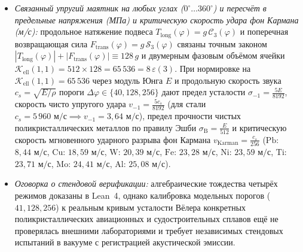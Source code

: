 \begin{enumerate}[label=\textbf{\arabic*.},leftmargin=*]
\begin{itemize}[noitemsep]
  \item \emph{Связанный упругий маятник на любых углах ($0^\circ\dots 360^\circ$) и пересчёт в предельные напряжения (МПа) и критическую скорость удара фон Кармана (м/с):} продольное натяжение подвеса $T_{\mathrm{long}}(\varphi) = g\,\mathcal{C}_3(\varphi)$ и поперечная возвращающая сила $F_{\mathrm{trans}}(\varphi) = g\,\mathcal{S}_3(\varphi)$ связаны точным законом $|T_{\mathrm{long}}(\varphi)| + |F_{\mathrm{trans}}(\varphi)| \equiv 128\,g$ и двумерным фазовым объёмом ячейки $\mathcal{K}_{\mathrm{ell}}(1,1) = 512 \times 128 = 65\,536 = 8\,\varepsilon(3)$. При нормировке на $\mathcal{K}_{\mathrm{ell}}(1,1) = 65\,536$ через модуль Юнга $E$ и продольную скорость звука $c_s = \sqrt{E/\rho}$ пороги $\Delta\varphi \in \{40, 128, 256\}$ дают предел усталости $\sigma_{-1} = \frac{5E}{8192}$, скорость чисто упругого удара $v_{-1} = \frac{5c_s}{8192}$ (для стали $c_s = 5\,960\text{ м/с} \implies v_{-1} = 3{,}64\text{ м/с}$), предел прочности чистых поликристаллических металлов по правилу Эшби $\sigma_{\mathrm{B}} = \frac{E}{512}$ и критическую скорость мгновенного ударного разрыва фон Кармана $v_{\mathrm{Karman}} = \frac{c_s}{256}$ ($\mathrm{Pb}$: $8{,}44\text{ м/с}$, $\mathrm{Cu}$: $18{,}59\text{ м/с}$, $\mathrm{W}$: $20{,}39\text{ м/с}$, $\mathrm{Fe}$: $23{,}28\text{ м/с}$, $\mathrm{Ni}$: $23{,}59\text{ м/с}$, $\mathrm{Ti}$: $23{,}71\text{ м/с}$, $\mathrm{Mo}$: $24{,}41\text{ м/с}$, $\mathrm{Al}$: $25{,}08\text{ м/с}$).
  \item \emph{Оговорка о стендовой верификации:} алгебраические тождества четырёх режимов доказаны в Lean~4, однако калибровка модельных порогов ($41, 128, 256$) к реальным кривым усталости Вёлера конкретных поликристаллических авиационных и судостроительных сплавов ещё не проверялась внешними лабораториями и требует независимых стендовых испытаний в вакууме с регистрацией акустической эмиссии.
  \end{itemize}
\end{enumerate}


